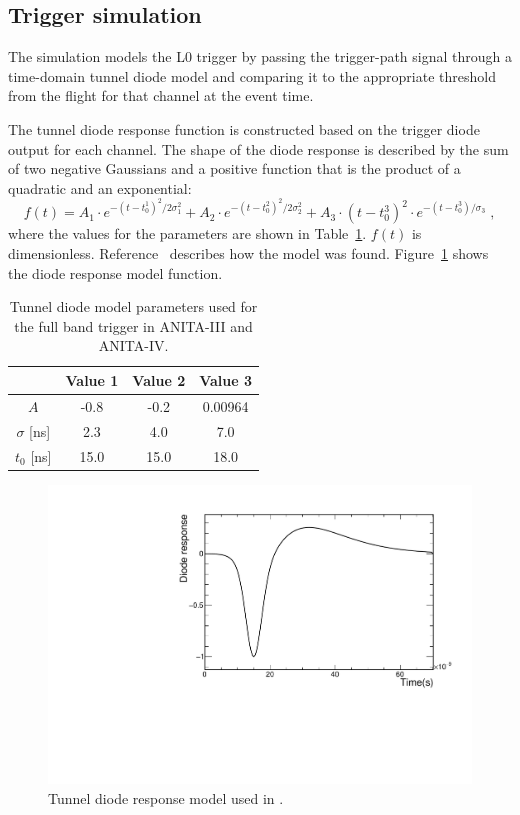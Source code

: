 \subsection{Trigger simulation}
\label{subsec:ANITA_trigger}
The simulation models the L0 trigger by passing the
trigger-path signal through a time-domain tunnel diode model and comparing it to the
appropriate threshold from the flight for that channel at the event
time.


The tunnel diode response function is constructed based on the trigger diode output for each channel.
The shape of the diode response is described by the sum of two negative Gaussians and a positive function that is the product of a quadratic and an exponential:
\begin{equation}
      f(t) = A_1 \cdot e^{-(t-t_0^1)^2/2\sigma_1^2} + 
      A_2 \cdot e^{-(t-t_0^2)^2/2\sigma_2^2} +
      A_3 \cdot \left( t-t_0^3 \right)^2 \cdot
      e^{-(t-t_0^3)/\sigma_3} \;,
    \end{equation}
\noindent where the values for the parameters are shown in
Table~\ref{tab:diodeModelParameters}.
$f(t)$ is dimensionless.
Reference~\cite{diodeModel} describes how the model was found. Figure~\ref{fig:ANITA_diodeModel} shows the diode response model function.

\begin{table}[h!]
\caption{Tunnel diode model parameters used for the full band trigger in ANITA-III and ANITA-IV.}
  \begin{center}
    \begin{tabular}{c|c|c|c} 
      & Value 1 & Value 2 & Value 3 \\
     \hline
      $A$           & -0.8  & -0.2   &  0.00964   \\
      $\sigma$ [ns] &  2.3  &  4.0   &  7.0       \\ 
      $t_0$  [ns]   & 15.0  & 15.0   & 18.0       \\
    \end{tabular}
  \end{center}
  \label{tab:diodeModelParameters}
\end{table}


\begin{figure}[!h]\centering
  \includegraphics[width=.45\linewidth]{./Figs/FullBand_diodeResponse.pdf}
  \caption{Tunnel diode response model used in \icemc.}
  \label{fig:ANITA_diodeModel}
\end{figure}

